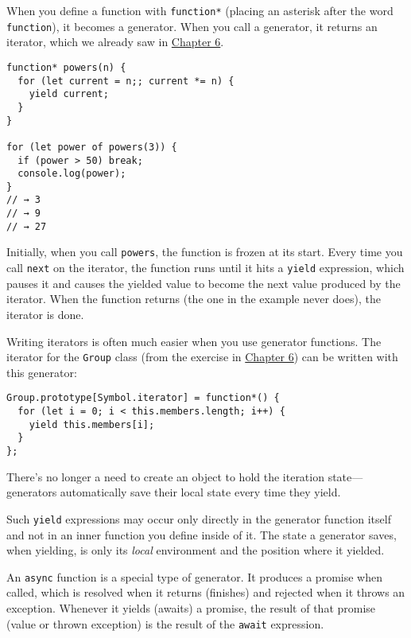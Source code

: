 When you define a function with \lstinline`function*` (placing an asterisk after the word \lstinline`function`), it becomes a generator. When you call a generator, it returns an iterator, which we already saw in \hyperref[object]{Chapter 6}.

\begin{lstlisting}
function* powers(n) {
  for (let current = n;; current *= n) {
    yield current;
  }
}

for (let power of powers(3)) {
  if (power > 50) break;
  console.log(power);
}
// → 3
// → 9
// → 27
\end{lstlisting}
\noindent{}

Initially, when you call \lstinline`powers`, the function is frozen at its start. Every time you call \lstinline`next` on the iterator, the function runs until it hits a \lstinline`yield` expression, which pauses it and causes the yielded value to become the next value produced by the iterator. When the function returns (the one in the example never does), the iterator is done.

Writing iterators is often much easier when you use generator functions. The iterator for the \lstinline`Group` class (from the exercise in \hyperref[object.group_iterator]{Chapter 6}) can be written with this generator:

\begin{lstlisting}
Group.prototype[Symbol.iterator] = function*() {
  for (let i = 0; i < this.members.length; i++) {
    yield this.members[i];
  }
};
\end{lstlisting}
\noindent{}

There's no longer a need to create an object to hold the iteration state—generators automatically save their local state every time they yield.

Such \lstinline`yield` expressions may occur only directly in the generator function itself and not in an inner function you define inside of it. The state a generator saves, when yielding, is only its \emph{local} environment and the position where it yielded.

An \lstinline`async` function is a special type of generator. It produces a promise when called, which is resolved when it returns (finishes) and rejected when it throws an exception. Whenever it yields (awaits) a promise, the result of that promise (value or thrown exception) is the result of the \lstinline`await` expression.

